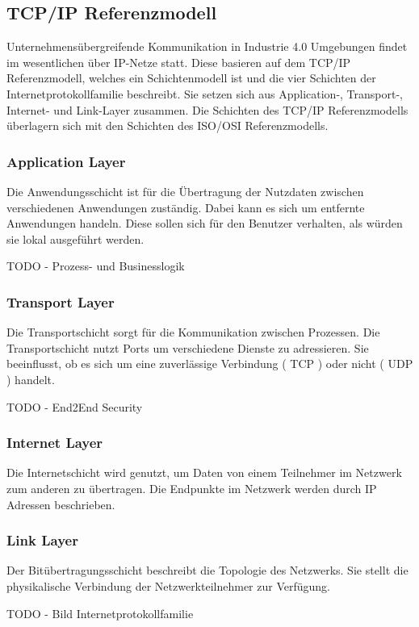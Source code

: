 \subsection{TCP/IP Referenzmodell}
\label{Grundlagen:TCP/IP Referenzmodell}
Unternehmensübergreifende Kommunikation in Industrie 4.0 Umgebungen findet im wesentlichen über IP-Netze statt. Diese basieren auf dem TCP/IP Referenzmodell, welches ein Schichtenmodell ist und die vier Schichten der Internetprotokollfamilie beschreibt. Sie setzen sich aus Application-, Transport-, Internet- und Link-Layer zusammen. Die Schichten des TCP/IP Referenzmodells überlagern sich mit den Schichten des ISO/OSI Referenzmodells. 

\subsubsection{Application Layer}
Die Anwendungsschicht ist für die Übertragung der Nutzdaten zwischen verschiedenen Anwendungen zuständig. Dabei kann es sich um entfernte Anwendungen handeln. Diese sollen sich für den Benutzer verhalten, als würden sie lokal ausgeführt werden.

TODO - Prozess- und Businesslogik

\subsubsection{Transport Layer}
Die Transportschicht sorgt für die Kommunikation zwischen Prozessen. Die Transportschicht nutzt Ports um verschiedene Dienste zu adressieren. Sie beeinflusst, ob es sich um eine zuverlässige Verbindung ( TCP ) oder nicht ( UDP ) handelt.

TODO - End2End Security

\subsubsection{Internet Layer}
Die Internetschicht wird genutzt, um Daten von einem Teilnehmer im Netzwerk zum anderen zu übertragen. Die Endpunkte im Netzwerk werden durch IP Adressen beschrieben.

\subsubsection{Link Layer}
Der Bitübertragungsschicht beschreibt die Topologie des Netzwerks. Sie stellt die physikalische Verbindung der Netzwerkteilnehmer zur Verfügung.

TODO - Bild Internetprotokollfamilie

